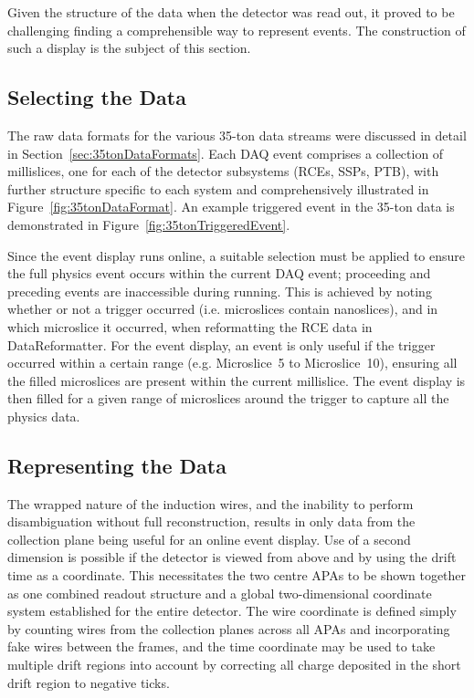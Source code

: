 Given the structure of the data when the detector was read out, it proved to be challenging finding a comprehensible way to represent events.  The construction of such a display is the subject of this section.

\subsection{Selecting the Data}\label{sec:SelectingEVDData}

The raw data formats for the various 35-ton data streams were discussed in detail in Section~\ref{sec:35tonDataFormats}.  Each DAQ event comprises a collection of millislices, one for each of the detector subsystems (RCEs, SSPs, PTB), with further structure specific to each system and comprehensively illustrated in Figure~\ref{fig:35tonDataFormat}.  An example triggered event in the 35-ton data is demonstrated in Figure~\ref{fig:35tonTriggeredEvent}.

Since the event display runs online, a suitable selection must be applied to ensure the full physics event occurs within the current DAQ event; proceeding and preceding events are inaccessible during running.  This is achieved by noting whether or not a trigger occurred (i.e. microslices contain nanoslices), and in which microslice it occurred, when reformatting the RCE data in DataReformatter.  For the event display, an event is only useful if the trigger occurred within a certain range (e.g. Microslice~5 to Microslice~10), ensuring all the filled microslices are present within the current millislice.  The event display is then filled for a given range of microslices around the trigger to capture all the physics data.

\subsection{Representing the Data}\label{RepresentingEVDData}

The wrapped nature of the induction wires, and the inability to perform disambiguation without full reconstruction, results in only data from the collection plane being useful for an online event display.  Use of a second dimension is possible if the detector is viewed from above and by using the drift time as a coordinate.  This necessitates the two centre APAs to be shown together as one combined readout structure and a global two-dimensional coordinate system established for the entire detector.  The wire coordinate is defined simply by counting wires from the collection planes across all APAs and incorporating fake wires between the frames, and the time coordinate may be used to take multiple drift regions into account by correcting all charge deposited in the short drift region to negative ticks.

